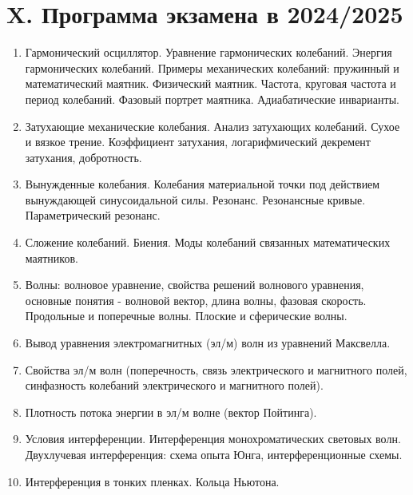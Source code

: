 \clearpage

\section{X. Программа экзамена в 2024/2025}

\begin{enumerate}

    \item Гармонический осциллятор. Уравнение гармонических колебаний. Энергия гармонических колебаний. Примеры механических колебаний: пружинный и математический маятник. Физический маятник. Частота, круговая частота и период колебаний. Фазовый портрет маятника. Адиабатические инварианты.

    \item Затухающие механические колебания. Анализ затухающих колебаний. Сухое и вязкое трение. Коэффициент затухания, логарифмический декремент затухания, добротность.

    \item Вынужденные колебания. Колебания материальной точки под действием вынуждающей синусоидальной силы. Резонанс. Резонансные кривые. Параметрический резонанс.

    \item Сложение колебаний. Биения. Моды колебаний связанных математических маятников.

    \item Волны: волновое уравнение, свойства решений волнового уравнения, основные понятия - волновой вектор, длина волны, фазовая скорость. Продольные и поперечные волны. Плоские и сферические волны.

    \item Вывод уравнения электромагнитных (эл/м) волн из уравнений Максвелла.

    \item Свойства эл/м волн (поперечность, связь электрического и магнитного полей, синфазность колебаний электрического и магнитного полей).

    \item Плотность потока энергии в эл/м волне (вектор Пойтинга).

    \item Условия интерференции. Интерференция монохроматических световых волн. Двухлучевая интерференция: схема опыта Юнга, интерференционные схемы.

    \item Интерференция в тонких пленках. Кольца Ньютона.


\end{enumerate}
